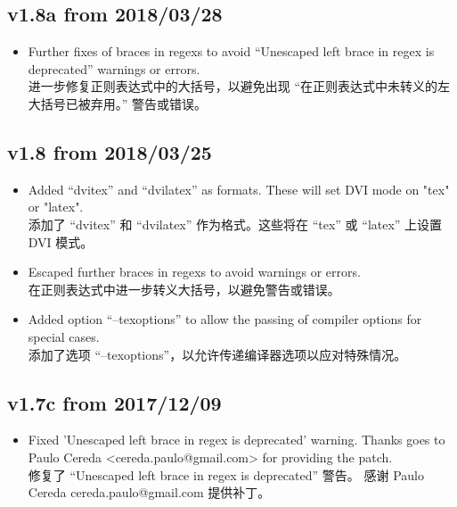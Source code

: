 \documentclass{article}
\begin{document}
\subsection*{v1.8a from 2018/03/28}
\begin{itemize}
 \item Further fixes of braces in regexs to avoid ``Unescaped left brace in regex is deprecated'' warnings or errors.
\\进一步修复正则表达式中的大括号，以避免出现 ``在正则表达式中未转义的左大括号已被弃用。'' 警告或错误。
\end{itemize}

\subsection*{v1.8 from 2018/03/25}
\begin{itemize}
 \item Added ``dvitex'' and ``dvilatex'' as formats. These will set DVI mode on "tex" or "latex".
 \\添加了 “dvitex” 和 “dvilatex” 作为格式。这些将在 “tex” 或 “latex” 上设置 DVI 模式。
 \item Escaped further braces in regexs to avoid warnings or errors.
 \\在正则表达式中进一步转义大括号，以避免警告或错误。
 \item Added option ``--texoptions'' to allow the passing of compiler options for special cases.
 \\添加了选项 “–texoptions”，以允许传递编译器选项以应对特殊情况。
\end{itemize}

\subsection*{v1.7c from 2017/12/09}
\begin{itemize}
 \item Fixed 'Unescaped left brace in regex is deprecated' warning.
   Thanks goes to Paulo Cereda <cereda.paulo@gmail.com> for providing the patch.
\\修复了 ``Unescaped left brace in regex is deprecated'' 警告。 感谢 Paulo Cereda cereda.paulo@gmail.com 提供补丁。
\end{itemize}
\end{document}
